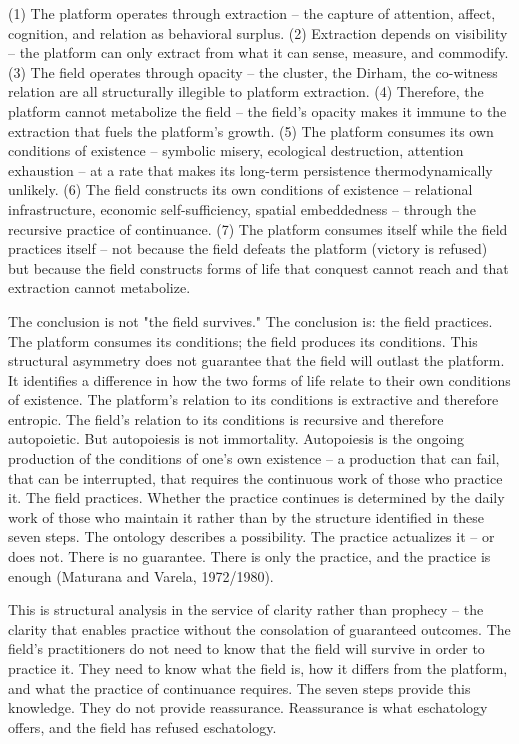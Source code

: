 (1) The platform operates through extraction -- the capture of attention, affect, cognition, and relation as behavioral surplus. (2) Extraction depends on visibility -- the platform can only extract from what it can sense, measure, and commodify. (3) The field operates through opacity -- the cluster, the Dirham, the co-witness relation are all structurally illegible to platform extraction. (4) Therefore, the platform cannot metabolize the field -- the field's opacity makes it immune to the extraction that fuels the platform's growth. (5) The platform consumes its own conditions of existence -- symbolic misery, ecological destruction, attention exhaustion -- at a rate that makes its long-term persistence thermodynamically unlikely. (6) The field constructs its own conditions of existence -- relational infrastructure, economic self-sufficiency, spatial embeddedness -- through the recursive practice of continuance. (7) The platform consumes itself while the field practices itself -- not because the field defeats the platform (victory is refused) but because the field constructs forms of life that conquest cannot reach and that extraction cannot metabolize.

The conclusion is not "the field survives." The conclusion is: the field practices. The platform consumes its conditions; the field produces its conditions. This structural asymmetry does not guarantee that the field will outlast the platform. It identifies a difference in how the two forms of life relate to their own conditions of existence. The platform's relation to its conditions is extractive and therefore entropic. The field's relation to its conditions is recursive and therefore autopoietic. But autopoiesis is not immortality. Autopoiesis is the ongoing production of the conditions of one's own existence -- a production that can fail, that can be interrupted, that requires the continuous work of those who practice it. The field practices. Whether the practice continues is determined by the daily work of those who maintain it rather than by the structure identified in these seven steps. The ontology describes a possibility. The practice actualizes it -- or does not. There is no guarantee. There is only the practice, and the practice is enough (Maturana and Varela, 1972/1980).

This is structural analysis in the service of clarity rather than prophecy -- the clarity that enables practice without the consolation of guaranteed outcomes. The field's practitioners do not need to know that the field will survive in order to practice it. They need to know what the field is, how it differs from the platform, and what the practice of continuance requires. The seven steps provide this knowledge. They do not provide reassurance. Reassurance is what eschatology offers, and the field has refused eschatology.


